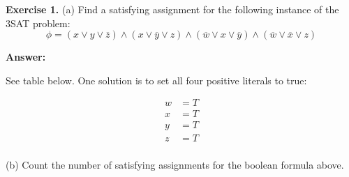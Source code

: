 \documentclass[11pt]{article}
\begin{document}
\vline

\medskip

\textbf{Exercise 1.} (a) Find a satisfying assignment for the following instance of the 3SAT problem:
\[
  \phi = (x \vee y \vee \overline{z}) \wedge (x \vee \overline{y} \vee z) \wedge (\overline{w}  \vee x \vee \overline{y}) \wedge (\overline{w} \vee \overline{x} \vee z)
\]

\textbf{Answer:}

See table below. One solution is to set all four positive literals to true:

\begin{align*}
  w & = T \\
  x & = T \\
  y & = T \\
  z & = T \\
\end{align*}

(b) Count the number of satisfying assignments for the boolean formula above.
\end{document}

